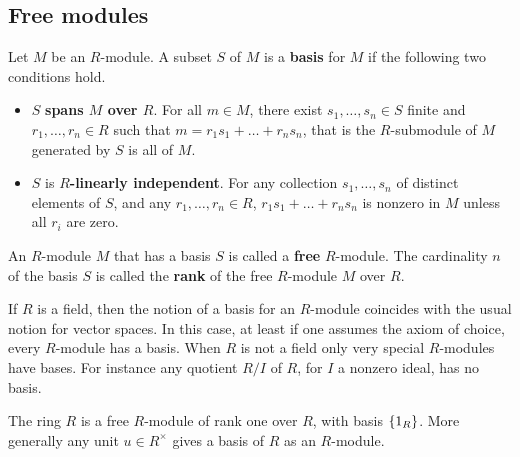 \pagebreak

\subsection{Free modules}

\begin{definition}
Let $ M $ be an $ R $-module. A subset $ S $ of $ M $ is a \textbf{basis} for $ M $ if the following two conditions hold.
\begin{itemize}
\item $ S $ \textbf{spans $ M $ over $ R $}. For all $ m \in M $, there exist $ s_1, \dots, s_n \in S $ finite and $ r_1, \dots, r_n \in R $ such that $ m = r_1s_1 + \dots + r_ns_n $, that is the $ R $-submodule of $ M $ generated by $ S $ is all of $ M $.
\item $ S $ is \textbf{$ R $-linearly independent}. For any collection $ s_1, \dots, s_n $ of distinct elements of $ S $, and any $ r_1, \dots, r_n \in R $, $ r_1s_1 + \dots + r_ns_n $ is nonzero in $ M $ unless all $ r_i $ are zero.
\end{itemize}
\end{definition}

\begin{definition}
An $ R $-module $ M $ that has a basis $ S $ is called a \textbf{free} $ R $-module. The cardinality $ n $ of the basis $ S $ is called the \textbf{rank} of the free $ R $-module $ M $ over $ R $.
\end{definition}


\begin{remark}
If $ R $ is a field, then the notion of a basis for an $ R $-module coincides with the usual notion for vector spaces. In this case, at least if one assumes the axiom of choice, every $ R $-module has a basis. When $ R $ is not a field only very special $ R $-modules have bases. For instance any quotient $ R / I $ of $ R $, for $ I $ a nonzero ideal, has no basis.
\end{remark}

\begin{example*}
The ring $ R $ is a free $ R $-module of rank one over $ R $, with basis $ \cbr{1_R} $. More generally any unit $ u \in R^\times $ gives a basis of $ R $ as an $ R $-module.
\end{example*}

